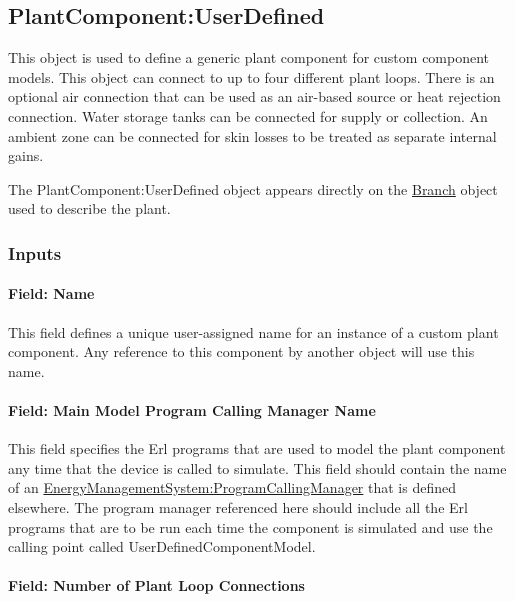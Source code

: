 \subsection{PlantComponent:UserDefined}\label{plantcomponentuserdefined}

This object is used to define a generic plant component for custom component models. This object can connect to up to four different plant loops.
There is an optional air connection that can be used as an air-based source or heat rejection connection.
Water storage tanks can be connected for supply or collection. An ambient zone can be connected for skin losses to be treated as separate internal gains.

The PlantComponent:UserDefined object appears directly on the \hyperref[branch]{Branch} object used to describe the plant.

\subsubsection{Inputs}\label{plantcomponentuserdefined-inputs}

\paragraph{Field: Name}\label{field-name-3-035}

This field defines a unique user-assigned name for an instance of a custom plant component. Any reference to this component by another object will use this name.

\paragraph{Field: Main Model Program Calling Manager Name}\label{field-main-model-program-calling-manager-name}

This field specifies the Erl programs that are used to model the plant component any time that the device is called to simulate. This field should contain the name of an \hyperref[energymanagementsystemprogramcallingmanager]{EnergyManagementSystem:ProgramCallingManager} that is defined elsewhere. The program manager referenced here should include all the Erl programs that are to be run each time the component is simulated and use the calling point called UserDefinedComponentModel.

\paragraph{Field: Number of Plant Loop Connections}\label{field-number-of-plant-loop-connections-2}

